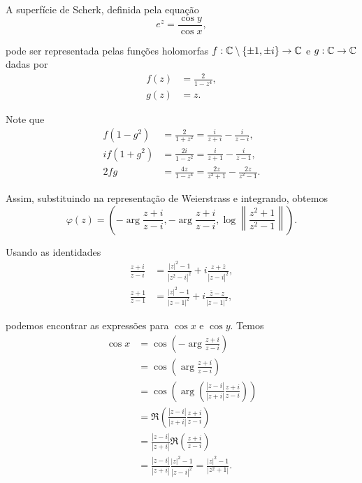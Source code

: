 \begin{exemplo}
	A superfície de Scherk, definida pela equação
	\begin{equation*}
	e^z = \frac{\cos y}{\cos x},
	\end{equation*}
	
	pode ser representada pelas funções holomorfas $f: \mathbb{C} \setminus \{\pm 1, \pm i \} \rightarrow \mathbb{C}$ e $g: \mathbb{C} \rightarrow \mathbb{C}$ dadas por
	\begin{align*}
	f(z) &= \frac{2}{1 - z^4}, \\
	g(z) &= z.
	\end{align*}
	
	Note que
	\begin{align*}
	f (1 - g^2) &= \frac{2}{1 + z^2} = \frac{i}{z + i} - \frac{i}{z - i}, \\
	i f (1 + g^2) &= \frac{2i}{1 - z^2} = \frac{i}{z + 1} - \frac{i}{z - 1}, \\
	2fg &= \frac{4z}{1 - z^4} = \frac{2z}{z^2 + 1} - \frac{2z}{z^2 - 1}.
	\end{align*}
	
	Assim, substituindo na representação de Weierstrass e integrando, obtemos
	\begin{equation*}
	\varphi(z) = \left( -\arg \frac{z + i}{z - i}, -\arg \frac{z + i}{z - i}, \log \left\| \frac{z^2 + 1}{z^2 - 1} \right\| \right).
	\end{equation*}
	
	Usando as identidades
	\begin{align*}
	\frac{z + i}{z - i} &= \frac{|z|^2 - 1}{|z^2 - i|^2} + i \frac{z + \overline{z}}{|z - i|^2}, \\
	\frac{z + 1}{z - 1} &= \frac{|z|^2 - 1}{|z - 1|^2} + i \frac{\overline{z} - z}{|z - 1|^2},
	\end{align*}
	
	podemos encontrar as expressões para $\cos x$ e $\cos y$. Temos
	\begin{align*}
	\cos x &= \cos \left( -\arg \frac{z + i}{z - i} \right) \\
	&= \cos \left( \arg \frac{z + i}{z - i} \right) \\
	&= \cos \left( \arg \left( \frac{|z - i|}{|z + i|} \frac{z + i}{z - i} \right) \right) \\
	&= \Re \left( \frac{|z - i|}{|z + i|} \frac{z + i}{z - i} \right) \\
	&= \frac{|z - i|}{|z + i|} \Re \left( \frac{z + i}{z - i} \right) \\
	&= \frac{|z - i|}{|z + i|} \frac{|z|^2 - 1}{|z - i|^2} = \frac{|z|^2 - 1}{|z^2 + 1|}.
	\end{align*}
	

\end{exemplo}
